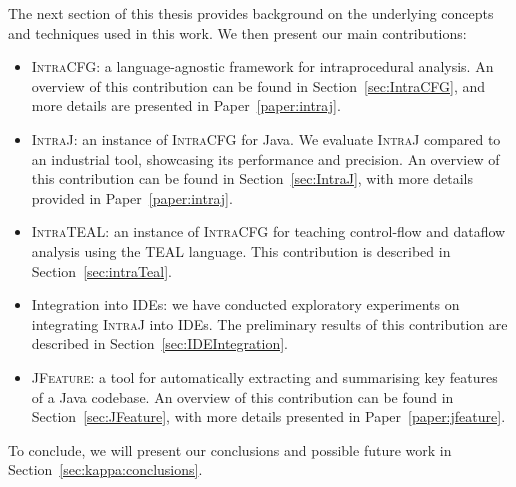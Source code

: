 The next section of this thesis provides background on the
underlying concepts and techniques used in this work. We then present our main contributions:
\begin{itemize}
	\item \textsc{IntraCFG}: a language-agnostic framework for intraprocedural analysis.
	 An overview of this contribution can be found in Section~\ref{sec:IntraCFG}, and more details are presented in Paper~\ref{paper:intraj}.
	\item \textsc{IntraJ}: an instance of \textsc{IntraCFG} for Java.
	We evaluate \textsc{IntraJ} compared to an industrial tool, showcasing its
	performance and precision. An overview of this contribution can be found in Section~\ref{sec:IntraJ},
	with more details provided in Paper~\ref{paper:intraj}.
	\item \textsc{IntraTEAL}: an instance of \textsc{IntraCFG} for teaching control-flow and  dataflow analysis using the TEAL language.
	This contribution is described in Section~\ref{sec:intraTeal}.
	\item Integration into IDEs: we have conducted exploratory experiments on integrating
	\textsc{IntraJ} into IDEs. The preliminary results of this contribution are described in Section~\ref{sec:IDEIntegration}.
	\item \textsc{JFeature}: a tool for automatically extracting and summarising key
	features of a Java codebase. An overview of this contribution can be found
	in Section~\ref{sec:JFeature}, with more details presented in Paper~\ref{paper:jfeature}.

\end{itemize}

To conclude, we will present our conclusions and possible future work in Section~\ref{sec:kappa:conclusions}.


